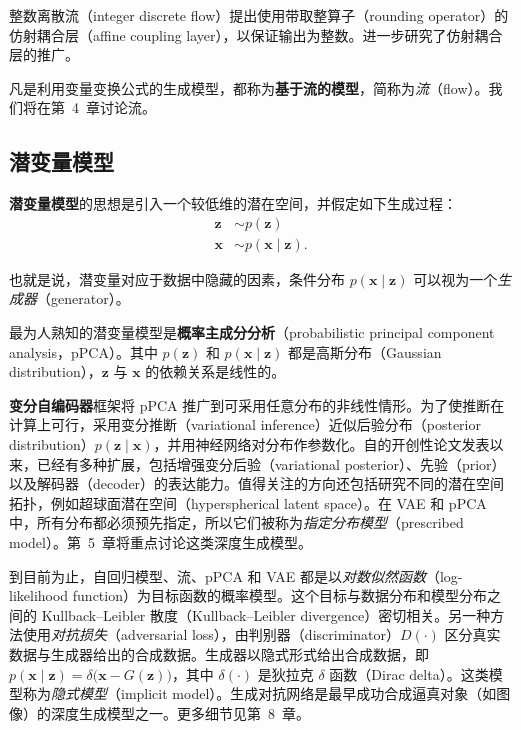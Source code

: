 整数离散流（integer discrete flow）提出使用带取整算子（rounding operator）的仿射耦合层（affine coupling layer），以保证输出为整数。进一步研究了仿射耦合层的推广。

凡是利用变量变换公式的生成模型，都称为\textbf{基于流的模型}，简称为\emph{流}（flow）。我们将在第~4~章讨论流。

\subsection{潜变量模型}
\textbf{潜变量模型}的思想是引入一个较低维的潜在空间，并假定如下生成过程：
\[
\begin{aligned}
\mathbf{z}&\sim p(\mathbf{z})\\
\mathbf{x}&\sim p(\mathbf{x}\mid\mathbf{z}).
\end{aligned}
\]

也就是说，潜变量对应于数据中隐藏的因素，条件分布 $p(\mathbf{x}\mid\mathbf{z})$ 可以视为一个\emph{生成器}（generator）。

最为人熟知的潜变量模型是\textbf{概率主成分分析}（probabilistic principal component analysis，pPCA）。其中 $p(\mathbf{z})$ 和 $p(\mathbf{x}\mid\mathbf{z})$ 都是高斯分布（Gaussian distribution），$\mathbf{z}$ 与 $\mathbf{x}$ 的依赖关系是线性的。

\textbf{变分自编码器}框架将 pPCA 推广到可采用任意分布的非线性情形。为了使推断在计算上可行，采用变分推断（variational inference）近似后验分布（posterior distribution）$p(\mathbf{z}\mid\mathbf{x})$，并用神经网络对分布作参数化。自的开创性论文发表以来，已经有多种扩展，包括增强变分后验（variational posterior）、先验（prior）以及解码器（decoder）的表达能力。值得关注的方向还包括研究不同的潜在空间拓扑，例如超球面潜在空间（hyperspherical latent space）。在 VAE 和 pPCA 中，所有分布都必须预先指定，所以它们被称为\emph{指定分布模型}（prescribed model）。第~5~章将重点讨论这类深度生成模型。

到目前为止，自回归模型、流、pPCA 和 VAE 都是以\emph{对数似然函数}（log-likelihood function）为目标函数的概率模型。这个目标与数据分布和模型分布之间的 Kullback–Leibler 散度（Kullback–Leibler divergence）密切相关。另一种方法使用\emph{对抗损失}（adversarial loss），由判别器（discriminator）$D(\cdot)$ 区分真实数据与生成器给出的合成数据。生成器以隐式形式给出合成数据，即 $p(\mathbf{x}\mid\mathbf{z})=\delta\bigl(\mathbf{x}-G(\mathbf{z})\bigr)$，其中 $\delta(\cdot)$ 是狄拉克 $\delta$ 函数（Dirac delta）。这类模型称为\emph{隐式模型}（implicit model）。生成对抗网络是最早成功合成逼真对象（如图像）的深度生成模型之一。更多细节见第~8~章。

